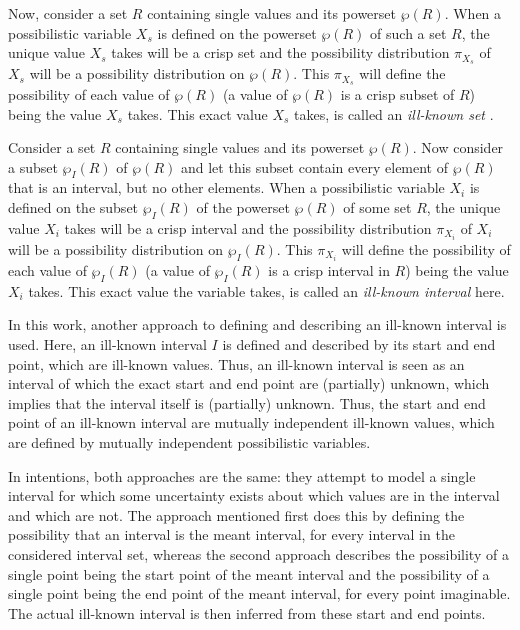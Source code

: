 Now, consider a set $R$ containing single values and its powerset $\wp(R)$. When a possibilistic variable $X_{s}$ is defined on the powerset $\wp(R)$ of such a set $R$, the unique value $X_{s}$ takes will be a crisp set and the possibility distribution $\pi_{X_{s}}$ of $X_{s}$ will be a possibility distribution on $\wp(R)$. This $\pi_{X_{s}}$ will define the possibility of each value of $\wp(R)$ (a value of $\wp(R)$ is a crisp subset of $R$) being the value $X_{s}$ takes. This exact value $X_{s}$ takes, is called an \emph{ill-known set} \cite{Dubois88b}.

Consider a set $R$ containing single values and its powerset $\wp(R)$. Now consider a subset $\wp_{I}(R)$ of $\wp(R)$ and let this subset contain every element of $\wp(R)$ that is an interval, but no other elements. When a possibilistic variable $X_{i}$ is defined on the subset $\wp_{I}(R)$ of the powerset $\wp(R)$ of some set $R$, the unique value $X_{i}$ takes will be a crisp interval and the possibility distribution $\pi_{X_{i}}$ of $X_{i}$ will be a possibility distribution on $\wp_{I}(R)$. This $\pi_{X_{i}}$ will define the possibility of each value of $\wp_{I}(R)$ (a value of $\wp_{I}(R)$ is a crisp interval in $R$) being the value $X_{i}$ takes. This exact value the variable takes, is called an \emph{ill-known interval} here.

In this work, another approach to defining and describing an ill-known interval is used. Here, an ill-known interval $I$ is defined and described by its start and end point, which are ill-known values. Thus, an ill-known interval is seen as an interval of which the exact start and end point are (partially) unknown, which implies that the interval itself is (partially) unknown. Thus, the start and end point of an ill-known interval are mutually independent ill-known values, which are defined by mutually independent possibilistic variables.

In intentions, both approaches are the same: they attempt to model a single interval for which some uncertainty exists about which values are in the interval and which are not. The approach mentioned first does this by defining the possibility that an interval is the meant interval, for every interval in the considered interval set, whereas the second approach describes the possibility of a single point being the start point of the meant interval and the possibility of a single point being the end point of the meant interval, for every point imaginable. The actual ill-known interval is then inferred from these start and end points.

